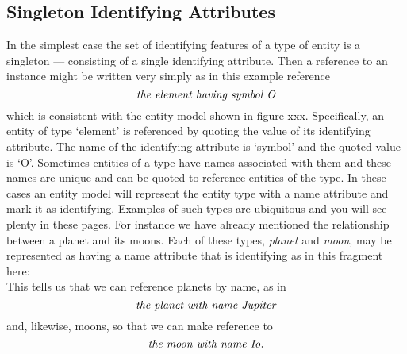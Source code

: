 \subsection{Singleton Identifying Attributes}
\mynote
In the simplest case the set of identifying features of a type of entity is a singleton --- consisting of a single identifying attribute. Then a reference to an instance might be written very simply as in this example reference
\begin{equation}
\label{theElementOxygen}
\mbox{\textit{the element having symbol O}}
\end{equation}
which is consistent with the entity model shown in figure xxx.
Specifically, an entity of type `element' is referenced by quoting the value of its identifying attribute. The name of the identifying attribute is
`symbol' and the quoted value is `O'.
\mynote
Sometimes entities of a type have names associated with them
 and these names are unique and can be  quoted to reference entities of the type. 
 In these cases an entity model will represent the entity type with a name attribute
and mark it as identifying. 
Examples of such types are ubiquitous and you will see plenty in these pages.
For instance we have already mentioned the relationship between
a planet and its moons.
Each of these types, \textit{planet} and  \textit{moon}, may be represented as having 
a name attribute that is identifying as in this fragment here:
\begin{equation}
\label{planetMoonModel}

\end{equation}
This tells us that we can reference planets by name, as in 
\begin{equation}
\label{theplanetJupiter}
\mbox{\textit{the planet with name Jupiter}}
\end{equation}
and, likewise, moons, so that we can make reference to 
\begin{equation}
\label{themoonIo}
\mbox{\textit{the moon with name Io}}.
\end{equation}


